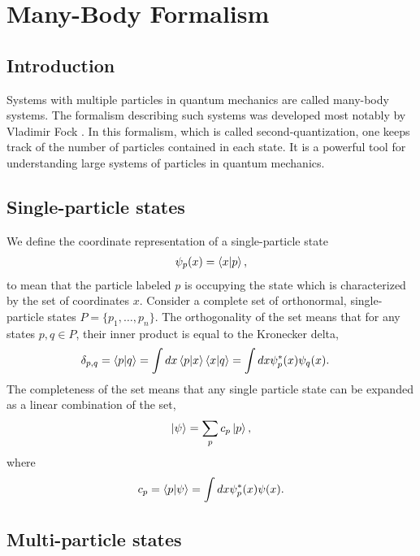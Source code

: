\documentclass[10pt]{article}
\begin{document}
\section{Many-Body Formalism}

\subsection{Introduction}

Systems with multiple particles in quantum mechanics are called many-body systems. The formalism describing such systems was developed most notably by Vladimir Fock \cite{fock}. In this formalism, which is called second-quantization, one keeps track of the number of particles contained in each state. It is a powerful tool for understanding large systems of particles in quantum mechanics.

\subsection{Single-particle states}

We define the coordinate representation of a single-particle state
\begin{align}
\psi_p(x) = \bra{x}\ket{p},
\end{align}
to mean that the particle labeled $p$ is occupying the state which is characterized by the set of coordinates $x$. Consider a complete set of orthonormal, single-particle states $P = \{p_1,\ldots ,p_n\}$. The orthogonality of the set means that for any states $p,q \in P$, their inner product is equal to the Kronecker delta,
\begin{align}
\delta_{p,q}
&= \bra{p}\ket{q}
=\int dx\bra{p}\ket{x}\bra{x}\ket{q}
=\int dx\psi^*_p(x)\psi_q(x).
\end{align}
The completeness of the set means that any single particle state can be expanded as a linear combination of the set,
\begin{align}
\ket{\psi}=\sum_pc_p\ket{p},
\end{align}
where
\begin{align}
c_p=\bra{p}\ket{\psi} = \int dx\psi^*_p(x)\psi(x).
\end{align}

\subsection{Multi-particle states}
\end{document}
